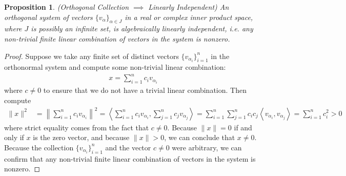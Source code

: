 \documentclass[12pt]{book}
\numberwithin{equation}{section} %
\theoremstyle{plain}
\newtheorem{prop}[thm]{Proposition}
\theoremstyle{definition}
\theoremstyle{remark}
\begin{document}
\begin{prop}
\label{prop:ortholi}
\emph{(Orthogonal Collection $\implies$ Linearly Independent)}
An orthogonal system of vectors $\{v_\alpha\}_{\alpha\in J}$
in a real or complex inner product space,
where $J$ is possibly an infinite set,
is algebraically linearly independent, i.e. any non-trivial finite
linear combination of vectors in the system is nonzero.
\end{prop}
\begin{proof}
Suppose we take any finite set of distinct vectors
$\{v_{\alpha_i}\}_{i=1}^n$ in the orthonormal system and compute some
non-trivial linear combination:
\begin{align*}
  x = \sum_{i=1}^n c_i v_{\alpha_i}
\end{align*}
where $c\neq 0$ to ensure that we do not have a trivial linear
combination.
Then compute
\begin{align*}
  \lVert x\rVert^2
  &=
  \left\lVert
  \sum_{i=1}^n c_i v_{\alpha_i}
  \right\rVert^2
  =
  \left\langle
  \sum_{i=1}^n c_i v_{\alpha_i}
  ,
  \sum_{j=1}^n c_j v_{\alpha_j}
  \right\rangle
  =
  \sum_{i=1}^n
  \sum_{j=1}^n
  c_i
  c_j
  \left\langle
  v_{\alpha_i}
  ,
  v_{\alpha_j}
  \right\rangle
  =
  \sum_{i=1}^n
  c_i^2
  > 0
\end{align*}
where strict equality comes from the fact that $c\neq 0$.
Because $\lVert x\rVert=0$ if and only if $x$ is the zero vector,
and because $\lVert x\rVert >0$, we can conclude that $x\neq 0$.
Because the collection $\{v_{\alpha_i}\}_{i=1}^n$ and the vector
$c\neq 0$ were arbitrary, we can confirm that any non-trivial finite
linear combination of vectors in the system is nonzero.
\end{proof}
\end{document}
